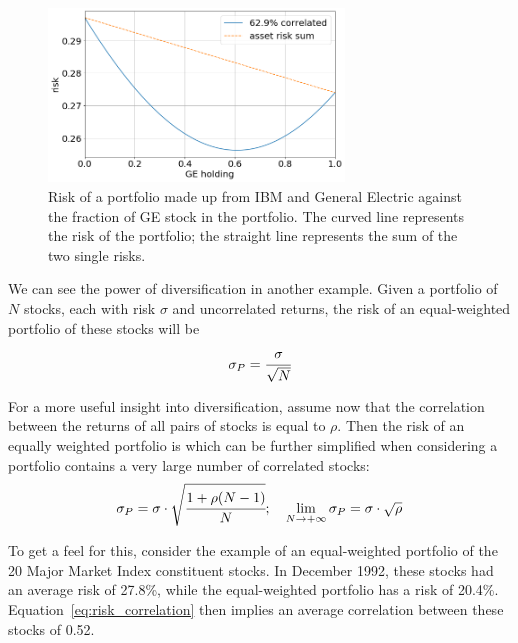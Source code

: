 \begin{figure}[htb]
	\centering
	\includegraphics[width=0.7\textwidth]{figures/diversification}
	\caption{Risk of a portfolio made up from IBM and General Electric against the fraction of GE stock in the portfolio. The curved line represents the risk of the portfolio; the straight line represents the sum of the two single risks.}
	\label{fig:diversification}
\end{figure}

We can see the power of diversification in another example. Given a  portfolio of $N$ stocks, each with risk $\sigma$ and uncorrelated returns, the risk of an equal-weighted portfolio of these stocks will be
\begin{equation}
\sigma_P = \cfrac{\sigma}{\sqrt{N}}
\end{equation}

For a more useful insight into diversification, assume now that the correlation between the returns of all pairs of stocks is equal to $\rho$. Then the risk of an equally weighted portfolio is which can be further simplified when considering a portfolio contains a very large number of correlated stocks:
\begin{equation}
\sigma_P = \sigma\cdot\sqrt{\cfrac{1+\rho(N-1)}{N}};\quad \lim_{N \to +\infty} \sigma_P = \sigma\cdot\sqrt{\rho}
\label{eq:risk_correlation}
\end{equation}

To get a feel for this, consider the example of an equal-weighted portfolio of the 20 Major Market Index constituent stocks. In December 1992, these stocks had an average risk of 27.8\%, while the equal-weighted portfolio has a risk of 20.4\%. Equation~\ref{eq:risk_correlation} then implies an average correlation between these stocks of 0.52. 

%

